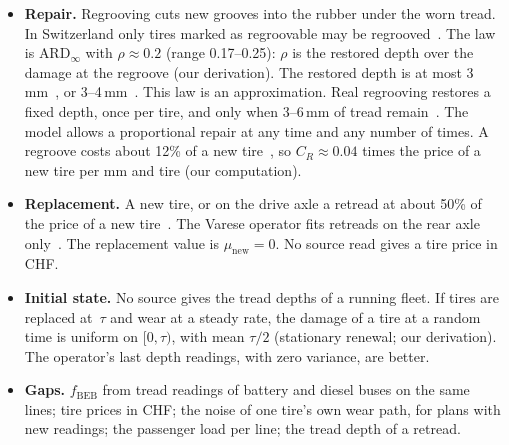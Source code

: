 \documentclass[11pt,a4paper]{article}
\theoremstyle{plain}
\theoremstyle{definition}
\theoremstyle{remark}
\begin{document}
\begin{itemize}
\begin{itemize}
      \item $f_{\mathrm{BEB}} = 1.35$ (range 1.3--1.8) is the factor of a BEB (our estimate).
        It rests on the tire cost in Shenzhen, about 30\% above diesel buses~\cite[p.~68]{WorldBank2021Shenzhen}, and on the miles per tire at Foothill Transit, where the gas buses ran 1.82 and 1.74 times as many miles per tire as the two BEB fleets~\cite[pp.~53,~78]{NREL2021Foothill} (our computation).
        The Foothill ratio is confounded by the routes: the report names potholes and broken curbs~\cite[p.~53]{NREL2021Foothill}.
      \item $q_j = 1$ is the route factor.
        The speed factor of the European emission inventory method is flat below 40\,km/h~\cite[Fig.~B1]{Boulter2006}, and every case-study line is slower, so no cited relation separates the lines.
    \end{itemize}
    On line 759 this gives 0.049\,mm (steer) and 0.052\,mm (drive) per weekday.
    The threshold comes after about 85,000\,km, about one year on line 759 (our computation).
  \item \textbf{Repair.}
    Regrooving cuts new grooves into the rubber under the worn tread.
    In Switzerland only tires marked as regroovable may be regrooved~\cite[Art.~60 para.~3]{VTS2026}.
    The law is $\text{ARD}_\infty$ with $\rho \approx 0.2$ (range 0.17--0.25): $\rho$ is the restored depth over the damage at the regroove (our derivation).
    The restored depth is at most 3\,mm~\cite[p.~44]{Goodyear2020}, or 3--4\,mm~\cite[slide~4]{Michelin2011regroove}.
    This law is an approximation.
    Real regrooving restores a fixed depth, once per tire, and only when 3--6\,mm of tread remain~\cite[pp.~44--45]{Goodyear2020}.
    The model allows a proportional repair at any time and any number of times.
    A regroove costs about 12\% of a new tire~\cite[slide~7]{Michelin2011regroove}, so $C_R \approx 0.04$ times the price of a new tire per mm and tire (our computation).
  \item \textbf{Replacement.}
    A new tire, or on the drive axle a retread at about 50\% of the price of a new tire~\cite[slide~7]{Michelin2011regroove}.
    The Varese operator fits retreads on the rear axle only~\cite[Sec.~2]{Giechaskiel2026bus}.
    The replacement value is $\mu_{\mathrm{new}} = 0$.
    No source read gives a tire price in CHF.
  \item \textbf{Initial state.}
    No source gives the tread depths of a running fleet.
    If tires are replaced at~$\tau$ and wear at a steady rate, the damage of a tire at a random time is uniform on $[0, \tau)$, with mean $\tau/2$ (stationary renewal; our derivation).
    The operator's last depth readings, with zero variance, are better.
  \item \textbf{Gaps.}
    $f_{\mathrm{BEB}}$ from tread readings of battery and diesel buses on the same lines; tire prices in CHF; the noise of one tire's own wear path, for plans with new readings; the passenger load per line; the tread depth of a retread.
\end{itemize}
\end{document}
